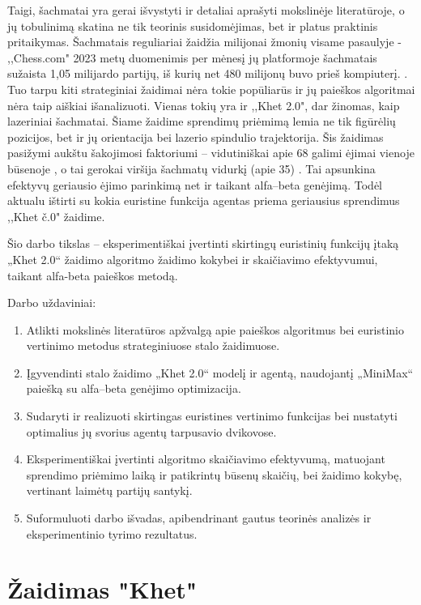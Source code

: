 \documentclass[]{VUMIFTemplateClass}
\begin{document}
Taigi, šachmatai yra gerai išvystyti ir detaliai aprašyti mokslinėje literatūroje, o jų tobulinimą skatina ne tik teorinis susidomėjimas, bet ir platus praktinis pritaikymas. Šachmatais reguliariai žaidžia milijonai žmonių visame pasaulyje - ,,Chess.com" 2023 metų duomenimis per mėnesį jų platformoje šachmatais sužaista 1,05 milijardo partijų, iš kurių net 480 milijonų buvo prieš kompiuterį. \cite{ChessComStats}. Tuo tarpu kiti strateginiai žaidimai nėra tokie popūliarūs ir jų paieškos algoritmai nėra taip aiškiai išanalizuoti. Vienas tokių yra ir ,,Khet 2.0", dar žinomas, kaip lazeriniai šachmatai. Šiame žaidime sprendimų priėmimą lemia ne tik figūrėlių pozicijos, bet ir jų orientacija bei lazerio spindulio trajektorija. Šis žaidimas pasižymi aukštu šakojimosi faktoriumi – vidutiniškai apie 68  galimi ėjimai vienoje būsenoje \cite[18~p.]{Nij09}, o tai gerokai viršija šachmatų vidurkį (apie 35) \cite[10~p.]{Lai15}. Tai apsunkina efektyvų geriausio ėjimo parinkimą net ir taikant alfa–beta genėjimą. Todėl aktualu ištirti su kokia euristine funkcija agentas priema geriausius sprendimus ,,Khet č.0" žaidime.


Šio darbo tikslas – eksperimentiškai įvertinti skirtingų euristinių funkcijų įtaką „Khet 2.0“ žaidimo algoritmo žaidimo kokybei ir skaičiavimo efektyvumui, taikant alfa-beta paieškos metodą.

Darbo uždaviniai:
\begin{enumerate}
\item Atlikti mokslinės literatūros apžvalgą apie paieškos algoritmus bei euristinio vertinimo metodus strateginiuose stalo žaidimuose.
\item Įgyvendinti stalo žaidimo „Khet 2.0“ modelį ir agentą, naudojantį „MiniMax“ paiešką su alfa–beta genėjimo optimizacija.
\item Sudaryti ir realizuoti skirtingas euristines vertinimo funkcijas bei nustatyti optimalius jų svorius agentų tarpusavio dvikovose.
\item Eksperimentiškai įvertinti algoritmo skaičiavimo efektyvumą, matuojant sprendimo priėmimo laiką ir patikrintų būsenų skaičių, bei žaidimo kokybę, vertinant laimėtų partijų santykį.
\item Suformuluoti darbo išvadas, apibendrinant gautus teorinės analizės ir eksperimentinio tyrimo rezultatus.
\end{enumerate}




\section{Žaidimas "Khet"}
\end{document}
